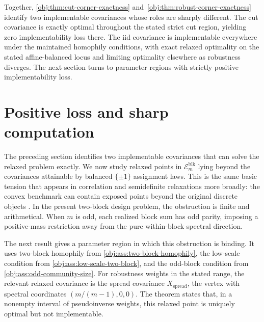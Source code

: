 \documentclass[11pt]{article}
\begin{document}
Together, \cref{obj:thm:cut-corner-exactness} and~\cref{obj:thm:robust-corner-exactness} identify two implementable covariances whose roles are sharply different. The cut covariance is exactly optimal throughout the stated strict cut region, yielding zero implementability loss there. The iid covariance is implementable everywhere under the maintained homophily conditions, with exact relaxed optimality on the stated affine-balanced locus and limiting optimality elsewhere as robustness diverges. The next section turns to parameter regions with strictly positive implementability loss.


\section{Positive loss and sharp computation}

The preceding section identifies two implementable covariances that can solve the relaxed problem exactly. We now study relaxed points in \(\mathcal E_m^{\mathrm{blk}}\) lying beyond the covariances attainable by balanced \(\{\pm1\}\) assignment laws. This is the same basic tension that appears in correlation and semidefinite relaxations more broadly: the convex benchmark can contain exposed points beyond the original discrete objects \citep{goemans1995,deza1997}. In the present two-block design problem, the obstruction is finite and arithmetical. When \(m\) is odd, each realized block sum has odd parity, imposing a positive-mass restriction away from the pure within-block spectral direction.

The next result gives a parameter region in which this obstruction is binding. It uses two-block homophily from \cref{obj:ass:two-block-homophily}, the low-scale condition from \cref{obj:ass:low-scale-two-block}, and the odd-block condition from \cref{obj:ass:odd-community-size}. For robustness weights in the stated range, the relevant relaxed covariance is the spread covariance \(X_{\mathrm{spread}}\), the vertex with spectral coordinates \((m/(m-1),0,0)\). The theorem states that, in a nonempty interval of pseudoinverse weights, this relaxed point is uniquely optimal but not implementable.
\end{document}
